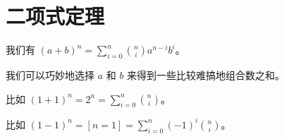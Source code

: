 \section{二项式定理}
\label{sec:二项式定理}

我们有 $(a + b)^n = \sum^{n}_{i = 0} {n \choose i} a^{n - i} b^i$。

我们可以巧妙地选择 $a$ 和 $b$ 来得到一些比较难搞地组合数之和。

比如 $(1 + 1)^n = 2^n = \sum^{n}_{i = 0} {n \choose i}$。

比如 $(1 -1)^n = [n = 1] = \sum^{n}_{i = 0} (-1)^i {n \choose i}$。

